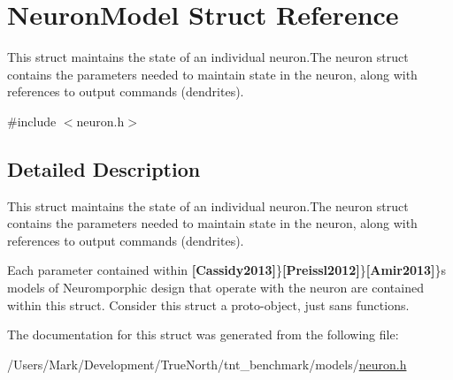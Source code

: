 \hypertarget{struct_neuron_model}{}\section{Neuron\+Model Struct Reference}
\label{struct_neuron_model}


This struct maintains the state of an individual neuron.\+The neuron struct contains the parameters needed to maintain state in the neuron, along with references to output commands (dendrites).  




{\ttfamily \#include $<$neuron.\+h$>$}



\subsection{Detailed Description}
This struct maintains the state of an individual neuron.\+The neuron struct contains the parameters needed to maintain state in the neuron, along with references to output commands (dendrites). 

Each parameter contained within {\bfseries [Cassidy2013]}\}{\bfseries [Preissl2012]}\}{\bfseries [Amir2013]}\}\textquotesingle{}s models of Neuromporphic design that operate with the neuron are contained within this struct. Consider this struct a proto-\/object, just sans functions. 

The documentation for this struct was generated from the following file\+:\begin{DoxyCompactItemize}
\item 
/\+Users/\+Mark/\+Development/\+True\+North/tnt\+\_\+benchmark/models/\hyperlink{neuron_8h}{neuron.\+h}\end{DoxyCompactItemize}
